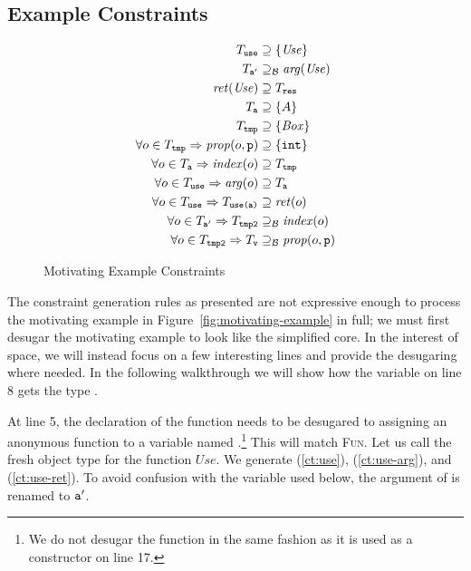 \subsection{Example Constraints}
\label{sec:example-constraints}

\begin{figure}
\begin{align}
T_{\texttt{use}} & \supseteq \{\mathit{Use}\}\label{ct:use}\\
T_{\texttt{a}'} & \supseteq_\mathcal{B} \mathit{arg}(\mathit{Use})\label{ct:use-arg}\\
\mathit{ret}(\mathit{Use}) & \supseteq T_{\texttt{res}}\label{ct:use-ret}\\
T_{\texttt{a}} & \supseteq \{A\} \label{ct:1}\\
T_{\texttt{tmp}} & \supseteq \{\mathit{Box}\} \label{ct:2}\\
\forall o \in T_{\texttt{tmp}} \Rightarrow \mathit{prop}(o, \texttt{p}) & \supseteq \{\texttt{int}\} \label{ct:3}\\
\forall o \in T_{\texttt{a}} \Rightarrow \mathit{index}(o) & \supseteq T_{\texttt{tmp}} \label{ct:5}\\
\forall o \in T_{\texttt{use}} \Rightarrow \mathit{arg}(o) & \supseteq T_{\texttt{a}}\label{ct:6}\\
\forall o \in T_{\texttt{use}} \Rightarrow T_{\texttt{use(a)}} & \supseteq \mathit{ret}(o)\label{ct:7}\\
\forall o \in T_{\texttt{a}'} \Rightarrow T_{\texttt{tmp2}} & \supseteq_\mathcal{B} \mathit{index}(o)\label{ct:8}\\
\forall o \in T_{\texttt{tmp2}} \Rightarrow T_{\texttt{v}} & \supseteq_\mathcal{B} \mathit{prop}(o, \texttt{p})\label{ct:9}
\end{align}
\caption{Motivating Example Constraints}
\label{fig:example-constraints}
\end{figure}

The constraint generation rules as presented are not expressive enough to
process the motivating example in Figure~\ref{fig:motivating-example} in full;
we must first desugar the motivating example to look like the simplified
core. In the interest of space, we will instead focus on a few interesting
lines and provide the desugaring where needed. In the following walkthrough we will show how the variable  on line 8 gets the type .

At line 5, the declaration of the  function needs to be desugared to
assigning an anonymous function to a variable named .\footnote{We do
  not desugar the  function in the same fashion as it is used as a
  constructor on line 17.} This will match \textsc{Fun}. Let us call the fresh
object type for the function $\mathit{Use}$. We generate (\ref{ct:use}),
(\ref{ct:use-arg}), and (\ref{ct:use-ret}). To avoid confusion with the
variable  used below, the argument of  is renamed to
$\texttt{a}'$.

